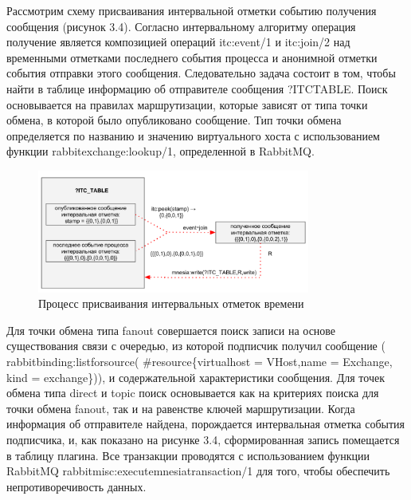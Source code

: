 {Рассмотрим схему присваивания интервальной отметки событию получения сообщения (рисунок 3.4). Согласно интервальному алгоритму операция получение является композицией операций itc:event/1 и itc:join/2 над временными отметками последнего события процесса и анонимной отметки события отправки этого сообщения. Следовательно задача состоит в том, чтобы найти в таблице информацию об отправителе сообщения ?ITC\underline{\hspace{0.25cm}}TABLE. Поиск основывается на правилах маршрутизации, которые зависят от типа точки обмена, в которой было опубликовано сообщение. Тип точки обмена определяется по названию и значению виртуального хоста с использованием функции rabbit\underline{\hspace{0.25cm}}exchange:lookup/1, определенной в RabbitMQ.
\begin{figure}
\centering
\includegraphics[width=0.8\textwidth]{img/send_recv2.png}
\caption{Процесс присваивания интервальных отметок времени}
\end{figure}
Для точки обмена типа fanout совершается поиск записи на основе существования связи с очередью, из которой подписчик получил сообщение ( rabbit\underline{\hspace{0.25cm}}binding:list\underline{\hspace{0.25cm}}for\underline{\hspace{0.25cm}}source( \#resource\{virtual\underline{\hspace{0.25cm}}host = VHost,name = Exchange, kind = exchange\})), и содержательной характеристики сообщения. Для точек обмена типа direct и topic поиск основывается как на критериях поиска для точки обмена fanout, так и на равенстве ключей маршрутизации. Когда информация об отправителе найдена, порождается интервальная отметка события подписчика, и, как показано на рисунке 3.4, сформированная запись помещается в таблицу плагина. Все транзакции проводятся с использованием функции RabbitMQ rabbit\underline{\hspace{0.25cm}}misc:execute\underline{\hspace{0.25cm}}mnesia\underline{\hspace{0.25cm}}transaction/1 для того, чтобы обеспечить непротиворечивость данных.

}

